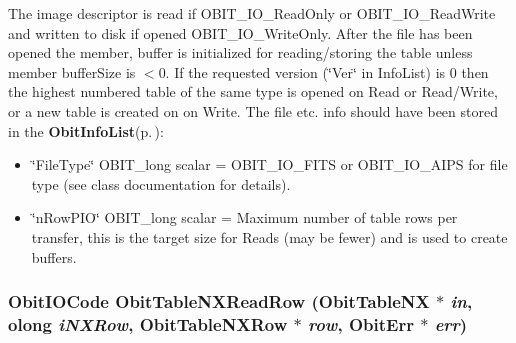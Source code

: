 The image descriptor is read if OBIT\_\-IO\_\-Read\-Only or OBIT\_\-IO\_\-Read\-Write and written to disk if opened OBIT\_\-IO\_\-Write\-Only. After the file has been opened the member, buffer is initialized for reading/storing the table unless member buffer\-Size is $<$0. If the requested version (\char`\"{}Ver\char`\"{} in Info\-List) is 0 then the highest numbered table of the same type is opened on Read or Read/Write, or a new table is created on on Write. The file etc. info should have been stored in the {\bf Obit\-Info\-List}{\rm (p.\,\pageref{structObitInfoList})}: \begin{itemize}
\item \char`\"{}File\-Type\char`\"{} OBIT\_\-long scalar = OBIT\_\-IO\_\-FITS or OBIT\_\-IO\_\-AIPS for file type (see class documentation for details). \item \char`\"{}n\-Row\-PIO\char`\"{} OBIT\_\-long scalar = Maximum number of table rows per transfer, this is the target size for Reads (may be fewer) and is used to create buffers. 
\end{itemize}
\subsubsection{\setlength{\rightskip}{0pt plus 5cm}Obit\-IOCode Obit\-Table\-NXRead\-Row ({\bf Obit\-Table\-NX} $\ast$ {\em in}, {\bf olong} {\em i\-NXRow}, {\bf Obit\-Table\-NXRow} $\ast$ {\em row}, {\bf Obit\-Err} $\ast$ {\em err})}\label{ObitTableNX_8c_a22}


